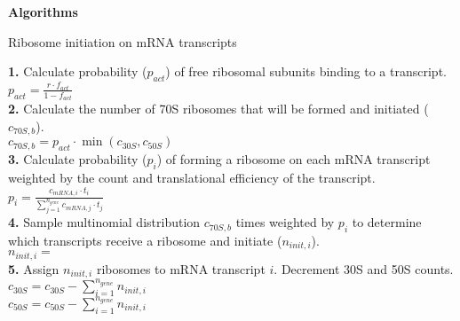 \documentclass[12pt]{article}
\begin{document}
\pagebreak
\textbf{Algorithms}

\begin{algorithm}[H]
\caption{Ribosome initiation on mRNA transcripts}
\label{polypeptide_initiation_algorithm}


  \textbf{1.} Calculate probability ($p_{act}$) of free ribosomal subunits binding to a transcript.\\
    \-\hspace{1cm} $p_{act} = \frac{r \cdot f_{act}}{1 - f_{act}}$\\
  \textbf{2.} Calculate the number of 70S ribosomes that will be formed and initiated ($c_{70S, b}$).\\
    \-\hspace{1cm} $c_{70S, b} = p_{act} \cdot \min(c_{30S}, c_{50S})$\\
  \textbf{3.} Calculate probability ($p_i$) of forming a ribosome on each mRNA transcript weighted by the count and translational efficiency of the transcript.\\
    \-\hspace{1cm} $p_i = \frac{c_{mRNA,i} \cdot t_i}{\sum\limits^{n_{gene}}_{j=1} c_{mRNA,j} \cdot t_j}$\\
  \textbf{4.} Sample multinomial distribution $c_{70S, b}$ times weighted by $p_i$ to determine which transcripts receive a ribosome and initiate ($n_{init,i}$).\\
    \-\hspace{1cm} $n_{init,i} =$ \\
  \textbf{5.} Assign $n_{init,i}$ ribosomes to mRNA transcript $i$. Decrement 30S and 50S counts.\\
    \-\hspace{1cm} $c_{30S} = c_{30S} - \sum\limits^{n_{gene}}_{i=1} n_{init,i}$\\
    \-\hspace{1cm} $c_{50S} = c_{50S} - \sum\limits^{n_{gene}}_{i=1} n_{init,i}$\\

\end{algorithm}
\end{document}
